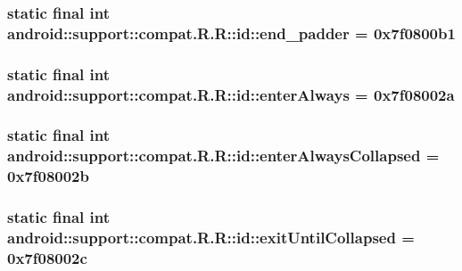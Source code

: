\hypertarget{classandroid_1_1support_1_1compat_1_1_r_1_1id_1101215125bf4b20069d989b717564b5}{
\subsubsection[{end\_\-padder}]{\setlength{\rightskip}{0pt plus 5cm}static final int android::support::compat.R.R::id::end\_\-padder = 0x7f0800b1}}
\label{classandroid_1_1support_1_1compat_1_1_r_1_1id_1101215125bf4b20069d989b717564b5}


\hypertarget{classandroid_1_1support_1_1compat_1_1_r_1_1id_318c64b115cb5024ce040e8b76016967}{
\subsubsection[{enterAlways}]{\setlength{\rightskip}{0pt plus 5cm}static final int android::support::compat.R.R::id::enterAlways = 0x7f08002a}}
\label{classandroid_1_1support_1_1compat_1_1_r_1_1id_318c64b115cb5024ce040e8b76016967}


\hypertarget{classandroid_1_1support_1_1compat_1_1_r_1_1id_7e91a2c531038425df3bd134251f4717}{
\subsubsection[{enterAlwaysCollapsed}]{\setlength{\rightskip}{0pt plus 5cm}static final int android::support::compat.R.R::id::enterAlwaysCollapsed = 0x7f08002b}}
\label{classandroid_1_1support_1_1compat_1_1_r_1_1id_7e91a2c531038425df3bd134251f4717}


\hypertarget{classandroid_1_1support_1_1compat_1_1_r_1_1id_3e4bbce874050326d1a8edfa98df856f}{
\subsubsection[{exitUntilCollapsed}]{\setlength{\rightskip}{0pt plus 5cm}static final int android::support::compat.R.R::id::exitUntilCollapsed = 0x7f08002c}}
\label{classandroid_1_1support_1_1compat_1_1_r_1_1id_3e4bbce874050326d1a8edfa98df856f}


